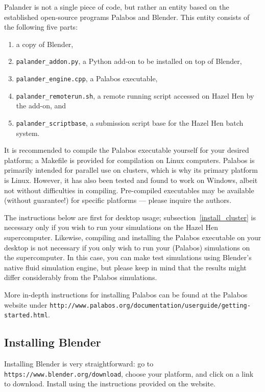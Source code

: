 \documentclass[12pt]{article}
\begin{document}
Palander is not a single piece of code, but rather an entity based on the established open-source programs 
Palabos and Blender. This entity consists of the following five parts:
\begin{enumerate}
\item a copy of Blender,
\item \verb|palander_addon.py|, a Python add-on to be installed on top of Blender,
\item \verb|palander_engine.cpp|, a Palabos executable,
\item \verb|palander_remoterun.sh|, a remote running script accessed on Hazel Hen by the add-on, and
\item \verb|palander_scriptbase|, a submission script base for the Hazel Hen batch system.
\end{enumerate}
It is recommended to compile the Palabos executable yourself for your desired platform; a Makefile is 
provided for compilation on Linux computers. Palabos is primarily intended for parallel use on clusters, 
which is why its primary platform is Linux. However, it has also been tested and found to work on Windows, 
albeit not without difficulties in compiling. Pre-compiled executables may be available (without guarantee!) 
for specific platforms --- please inquire the authors.

The instructions below are first for desktop usage; subsection~\ref{install_cluster} is necessary only if you 
wish to run your simulations on the Hazel Hen supercomputer. Likewise, compiling and installing the Palabos 
executable on your desktop is not necessary if you only wish to run your (Palabos) simulations on the 
supercomputer. In this case, you can make test simulations using Blender's native fluid simulation engine, 
but please keep in mind that the results might differ considerably from the Palabos simulations.

More in-depth instructions for installing Palabos can be found at the Palabos website under 
\verb|http://www.palabos.org/documentation/userguide/getting-started.html|.

\subsection{Installing Blender}

Installing Blender is very straightforward: go to \verb|https://www.blender.org/download|, choose your 
platform, and click on a link to download. Install using the instructions provided on the website.
\end{document}

